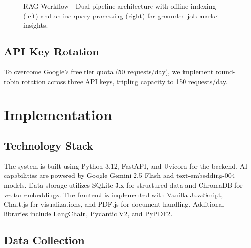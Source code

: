 \documentclass[conference]{IEEEtran}
\begin{document}
\begin{figure}[htbp]
\caption{RAG Workflow - Dual-pipeline architecture with offline indexing (left) and online query processing (right) for grounded job market insights.}
\label{fig:rag_workflow}
\end{figure}

\subsection{API Key Rotation}

To overcome Google's free tier quota (50 requests/day), we implement round-robin rotation across three API keys, tripling capacity to 150 requests/day.

\section{Implementation}

\subsection{Technology Stack}

The system is built using Python 3.12, FastAPI, and Uvicorn for the backend. AI capabilities are powered by Google Gemini 2.5 Flash and text-embedding-004 models. Data storage utilizes SQLite 3.x for structured data and ChromaDB for vector embeddings. The frontend is implemented with Vanilla JavaScript, Chart.js for visualizations, and PDF.js for document handling. Additional libraries include LangChain, Pydantic V2, and PyPDF2.

\subsection{Data Collection}
\end{document}
